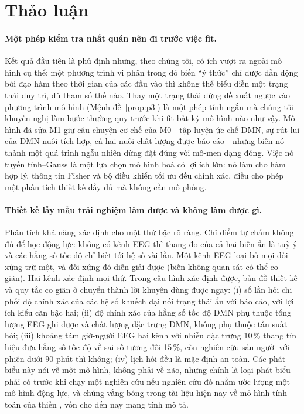 \section{Thảo luận}
\label{sec:discussion}

\paragraph{Một phép kiểm tra nhất quán nên đi trước việc fit.} Kết quả đầu tiên là phủ định nhưng, theo chúng tôi, có ích vượt ra ngoài mô hình cụ thể: một phương trình vi phân trong đó biến ``ý thức'' chỉ được dẫn động bởi đạo hàm theo thời gian của các đầu vào thì không thể biểu diễn một trạng thái duy trì, dù tham số thế nào. Thay một trạng thái dừng đề xuất ngược vào phương trình mô hình (Mệnh đề~\ref{prop:p3}) là một phép tính ngắn mà chúng tôi khuyến nghị làm bước thường quy trước khi fit bất kỳ mô hình nào như vậy. Mô hình đã sửa M1 giữ câu chuyện cơ chế của M0---tập luyện ức chế DMN, sự rút lui của DMN nuôi tích hợp, cả hai nuôi chất lượng được báo cáo---nhưng biến nó thành một quá trình ngẫu nhiên dừng đặt đúng với mô-men dạng đóng. Việc nó tuyến tính--Gauss là một lựa chọn mô hình hoá có lợi ích lớn: nó làm cho hàm hợp lý, thông tin Fisher và bộ điều khiển tối ưu đều chính xác, điều cho phép một phân tích thiết kế đầy đủ mà không cần mô phỏng.

\paragraph{Thiết kế lấy mẫu trải nghiệm làm được và không làm được gì.} Phân tích khả năng xác định cho một thứ bậc rõ ràng. Chỉ điểm tự chấm không đủ để học động lực: không có kênh EEG thì thang đo của cả hai biến ẩn là tuỳ ý và các hằng số tốc độ chỉ biết tới hệ số vài lần. Một kênh EEG loại bỏ mọi đối xứng trừ một, và đối xứng đó diễn giải được (biến không quan sát có thể co giãn). Hai kênh xác định mọi thứ. Trong cấu hình xác định được, bản đồ thiết kế và quy tắc co giãn ở  chuyển thành lời khuyên dùng được ngay: (i) số lần hỏi chi phối độ chính xác của các hệ số khuếch đại nối trạng thái ẩn với báo cáo, với lợi ích kiểu căn bậc hai; (ii) độ chính xác của hằng số tốc độ DMN phụ thuộc tổng lượng EEG ghi được và chất lượng đặc trưng DMN, không phụ thuộc tần suất hỏi; (iii) khoảng tám giờ-người EEG hai kênh với nhiễu đặc trưng 10\,\% thang tín hiệu đưa hằng số tốc độ về sai số tương đối 15\,\%, còn nghiên cứu sáu người với phiên dưới 90 phút thì không; (iv) lịch hỏi đều là mặc định an toàn. Các phát biểu này nói về một mô hình, không phải về não, nhưng chính là loại phát biểu phải có trước khi chạy một nghiên cứu nếu nghiên cứu đó nhằm ước lượng một mô hình động lực, và chúng vắng bóng trong tài liệu hiện nay về mô hình tính toán của thiền \citep{Laukkonen2021,SandvedSmith2021}, vốn cho đến nay mang tính mô tả.

